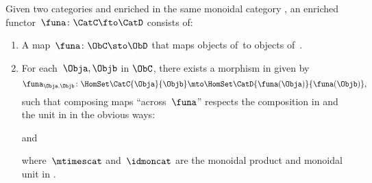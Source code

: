 \begin{ctdefinition}
    \label{def:enrichedfunctor}
    Given two categories \CatC and \CatD enriched in the same monoidal category \CatV, an enriched functor~$\funa\colon \CatC \fto \CatD$ consists of:
    \begin{enumerate}
        \item A map~$\funa\colon \ObC \sto \ObD$ that maps objects of~\CatC to objects of~\CatD.
        \item For each~$\Obja, \Objb$ in $\ObC$, there exists a morphism in \CatV given by
              \begin{equation*}
                  \funa_{\Obja, \Objb} \colon \HomSet\CatC{\Obja}{\Objb} \mto \HomSet\CatD{\funa(\Obja)}{\funa(\Objb)},
              \end{equation*}
              such that composing maps ``across~$\funa$'' respects the composition in \CatC and the unit in \CatV in the obvious ways:
              \begin{center}
              \end{center}
              and
              \begin{center}
              \end{center}
              where~$\mtimescat$ and~$\idmoncat$ are the monoidal product and monoidal unit in \CatV.
    \end{enumerate}
\end{ctdefinition}


